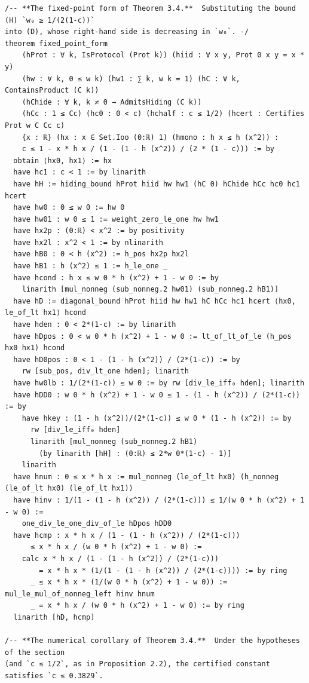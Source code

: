 \documentclass[11pt,a4paper]{article}
\theoremstyle{definition}
\theoremstyle{remark}
\begin{document}
\begin{Verbatim}[fontsize=\scriptsize,formatcom=\leanmono,samepage=false]
/-- **The fixed-point form of Theorem 3.4.**  Substituting the bound (H) `w₀ ≥ 1/(2(1-c))`
into (D), whose right-hand side is decreasing in `w₀`. -/
theorem fixed_point_form
    (hProt : ∀ k, IsProtocol (Prot k)) (hiid : ∀ x y, Prot 0 x y = x * y)
    (hw : ∀ k, 0 ≤ w k) (hw1 : ∑ k, w k = 1) (hC : ∀ k, ContainsProduct (C k))
    (hChide : ∀ k, k ≠ 0 → AdmitsHiding (C k))
    (hCc : 1 ≤ Cc) (hc0 : 0 < c) (hchalf : c ≤ 1/2) (hcert : Certifies Prot w C Cc c)
    {x : ℝ} (hx : x ∈ Set.Ioo (0:ℝ) 1) (hmono : h x ≤ h (x^2)) :
    c ≤ 1 - x * h x / (1 - (1 - h (x^2)) / (2 * (1 - c))) := by
  obtain ⟨hx0, hx1⟩ := hx
  have hc1 : c < 1 := by linarith
  have hH := hiding_bound hProt hiid hw hw1 (hC 0) hChide hCc hc0 hc1 hcert
  have hw0 : 0 ≤ w 0 := hw 0
  have hw01 : w 0 ≤ 1 := weight_zero_le_one hw hw1
  have hx2p : (0:ℝ) < x^2 := by positivity
  have hx2l : x^2 < 1 := by nlinarith
  have hB0 : 0 < h (x^2) := h_pos hx2p hx2l
  have hB1 : h (x^2) ≤ 1 := h_le_one _
  have hcond : h x ≤ w 0 * h (x^2) + 1 - w 0 := by
    linarith [mul_nonneg (sub_nonneg.2 hw01) (sub_nonneg.2 hB1)]
  have hD := diagonal_bound hProt hiid hw hw1 hC hCc hc1 hcert ⟨hx0, le_of_lt hx1⟩ hcond
  have hden : 0 < 2*(1-c) := by linarith
  have hDpos : 0 < w 0 * h (x^2) + 1 - w 0 := lt_of_lt_of_le (h_pos hx0 hx1) hcond
  have hD0pos : 0 < 1 - (1 - h (x^2)) / (2*(1-c)) := by
    rw [sub_pos, div_lt_one hden]; linarith
  have hw0lb : 1/(2*(1-c)) ≤ w 0 := by rw [div_le_iff₀ hden]; linarith
  have hDD0 : w 0 * h (x^2) + 1 - w 0 ≤ 1 - (1 - h (x^2)) / (2*(1-c)) := by
    have hkey : (1 - h (x^2))/(2*(1-c)) ≤ w 0 * (1 - h (x^2)) := by
      rw [div_le_iff₀ hden]
      linarith [mul_nonneg (sub_nonneg.2 hB1)
        (by linarith [hH] : (0:ℝ) ≤ 2*w 0*(1-c) - 1)]
    linarith
  have hnum : 0 ≤ x * h x := mul_nonneg (le_of_lt hx0) (h_nonneg (le_of_lt hx0) (le_of_lt hx1))
  have hinv : 1/(1 - (1 - h (x^2)) / (2*(1-c))) ≤ 1/(w 0 * h (x^2) + 1 - w 0) :=
    one_div_le_one_div_of_le hDpos hDD0
  have hcmp : x * h x / (1 - (1 - h (x^2)) / (2*(1-c)))
      ≤ x * h x / (w 0 * h (x^2) + 1 - w 0) :=
    calc x * h x / (1 - (1 - h (x^2)) / (2*(1-c)))
        = x * h x * (1/(1 - (1 - h (x^2)) / (2*(1-c)))) := by ring
      _ ≤ x * h x * (1/(w 0 * h (x^2) + 1 - w 0)) := mul_le_mul_of_nonneg_left hinv hnum
      _ = x * h x / (w 0 * h (x^2) + 1 - w 0) := by ring
  linarith [hD, hcmp]

/-- **The numerical corollary of Theorem 3.4.**  Under the hypotheses of the section
(and `c ≤ 1/2`, as in Proposition 2.2), the certified constant satisfies `c ≤ 0.3829`.


\end{Verbatim}
\end{document}
